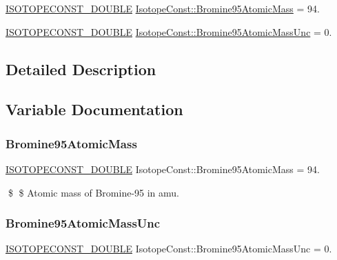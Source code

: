 \begin{DoxyCompactItemize}
\item 
\mbox{\hyperlink{group___isotope_const-_macros_ga8f45a7272ce02c0b4c65c44636ed719a}{I\+S\+O\+T\+O\+P\+E\+C\+O\+N\+S\+T\+\_\+\+D\+O\+U\+B\+LE}} \mbox{\hyperlink{group___isotope_const-_bromine-_br95_ga9383ee2f827de5f6532539f33be0dca1}{Isotope\+Const\+::\+Bromine95\+Atomic\+Mass}} = 94.
\item 
\mbox{\hyperlink{group___isotope_const-_macros_ga8f45a7272ce02c0b4c65c44636ed719a}{I\+S\+O\+T\+O\+P\+E\+C\+O\+N\+S\+T\+\_\+\+D\+O\+U\+B\+LE}} \mbox{\hyperlink{group___isotope_const-_bromine-_br95_ga75550c9eae0f728ed79c2750eb4117a0}{Isotope\+Const\+::\+Bromine95\+Atomic\+Mass\+Unc}} = 0.
\end{DoxyCompactItemize}


\subsection{Detailed Description}


\subsection{Variable Documentation}
\mbox{\label{group___isotope_const-_bromine-_br95_ga9383ee2f827de5f6532539f33be0dca1}} 
\subsubsection{\texorpdfstring{Bromine95\+Atomic\+Mass}{Bromine95AtomicMass}}
{\footnotesize\ttfamily \mbox{\hyperlink{group___isotope_const-_macros_ga8f45a7272ce02c0b4c65c44636ed719a}{I\+S\+O\+T\+O\+P\+E\+C\+O\+N\+S\+T\+\_\+\+D\+O\+U\+B\+LE}} Isotope\+Const\+::\+Bromine95\+Atomic\+Mass = 94.}

\$ \$ Atomic mass of Bromine-\/95 in amu. \mbox{\label{group___isotope_const-_bromine-_br95_ga75550c9eae0f728ed79c2750eb4117a0}} 
\subsubsection{\texorpdfstring{Bromine95\+Atomic\+Mass\+Unc}{Bromine95AtomicMassUnc}}
{\footnotesize\ttfamily \mbox{\hyperlink{group___isotope_const-_macros_ga8f45a7272ce02c0b4c65c44636ed719a}{I\+S\+O\+T\+O\+P\+E\+C\+O\+N\+S\+T\+\_\+\+D\+O\+U\+B\+LE}} Isotope\+Const\+::\+Bromine95\+Atomic\+Mass\+Unc = 0.}

